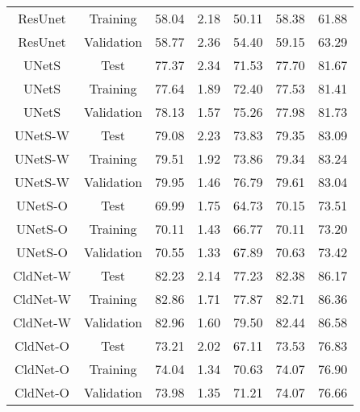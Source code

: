 \begin{table}[H]
{\begin{tabular}{ccccccc}
            ResUnet    & Training   & 58.04     & 2.18     & 50.11    & 58.38       & 61.88    \\
            ResUnet    & Validation & 58.77     & 2.36     & 54.40    & 59.15       & 63.29    \\
            UNetS      & Test       & 77.37     & 2.34     & 71.53    & 77.70       & 81.67    \\
            UNetS      & Training   & 77.64     & 1.89     & 72.40    & 77.53       & 81.41    \\
            UNetS      & Validation & 78.13     & 1.57     & 75.26    & 77.98       & 81.73    \\
            UNetS-W    & Test       & 79.08     & 2.23     & 73.83    & 79.35       & 83.09    \\
            UNetS-W    & Training   & 79.51     & 1.92     & 73.86    & 79.34       & 83.24    \\
            UNetS-W    & Validation & 79.95     & 1.46     & 76.79    & 79.61       & 83.04    \\
            UNetS-O    & Test       & 69.99     & 1.75     & 64.73    & 70.15       & 73.51    \\
            UNetS-O    & Training   & 70.11     & 1.43     & 66.77    & 70.11       & 73.20    \\
            UNetS-O    & Validation & 70.55     & 1.33     & 67.89    & 70.63       & 73.42    \\
            CldNet-W   & Test       & 82.23     & 2.14     & 77.23    & 82.38       & 86.17    \\
            CldNet-W   & Training   & 82.86     & 1.71     & 77.87    & 82.71       & 86.36    \\
            CldNet-W   & Validation & 82.96     & 1.60     & 79.50    & 82.44       & 86.58    \\
            CldNet-O   & Test       & 73.21     & 2.02     & 67.11    & 73.53       & 76.83    \\
            CldNet-O   & Training   & 74.04     & 1.34     & 70.63    & 74.07       & 76.90    \\
            CldNet-O   & Validation & 73.98     & 1.35     & 71.21    & 74.07       & 76.66    \\
            \hline
        \end{tabular}
    }
\end{table}